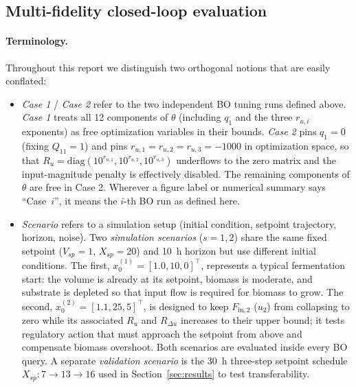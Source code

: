\documentclass[11pt,a4paper]{article}
\begin{document}
\subsection{Multi-fidelity closed-loop evaluation}

\paragraph{Terminology.}
Throughout this report we distinguish two orthogonal notions that are easily conflated:
\begin{itemize}
    \item \emph{Case 1} / \emph{Case 2} refer to the two independent BO tuning runs defined above. \emph{Case 1} treats all 12 components of $\theta$ (including $q_1$ and the three $r_{u,i}$ exponents) as free optimization variables in their bounds. \emph{Case 2} pins $q_1 = 0$ (fixing $Q_{11} = 1$) and pins $r_{u,1} = r_{u,2} = r_{u,3} = -1000$ in optimization space, so that $R_u = \mathrm{diag}(10^{r_{u,1}}, 10^{r_{u,2}}, 10^{r_{u,3}})$ underflows to the zero matrix and the input-magnitude penalty is effectively disabled. The remaining components of $\theta$ are free in Case 2. Wherever a figure label or numerical summary says ``Case~$i$'', it means the $i$-th BO run as defined here.
    \item \emph{Scenario} refers to a simulation setup (initial condition, setpoint trajectory, horizon, noise). Two \emph{simulation scenarios} ($s = 1, 2$) share the same fixed setpoint ($V_{sp} = 1$, $X_{sp} = 20$) and 10~h horizon but use different initial conditions. The first, $x_0^{(1)} = [1.0, 10, 0]^\top$, represents a typical fermentation start: the volume is already at its setpoint, biomass is moderate, and substrate is depleted so that input flow is required for biomass to grow. The second, $x_0^{(2)} = [1.1, 25, 5]^\top$, is designed to keep $F_{\mathrm{in},2}$ ($u_2$) from collapsing to zero while its associated $R_u$ and $R_{\Delta u}$ increases to their upper bound; it tests regulatory action that must approach the setpoint from above and compensate biomass overshoot. Both scenarios are evaluated inside every BO query. A separate \emph{validation scenario} is the 30~h three-step setpoint schedule $X_{sp}: 7 \to 13 \to 16$ used in Section~\ref{sec:results} to test transferability.
\end{itemize}
\end{document}

